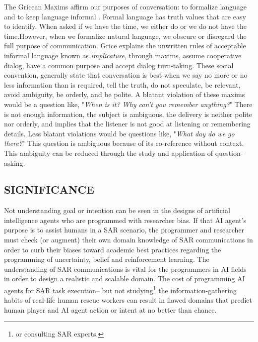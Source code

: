 The Gricean Maxims affirm our purposes of conversation: to formalize language and to keep language informal \citet{grice_1975}. Formal language has truth values that are easy to identify. When asked if we have the time, we either do or we do not have the time.However, when we formalize natural language, we obscure or disregard the full purpose of communication. Grice explains the unwritten rules of acceptable informal language known as \emph{implicature}, through maxims,  assume cooperative dialog, have a common purpose and accept dialog turn-taking\citet{grice_1975}. These social convention, generally state that conversation is best when we say no more or no less information than is required, tell the truth, do not speculate, be relevant, avoid ambiguity, be orderly, and be polite. A blatant violation of these maxims would be a question like, "\emph{When is it? Why can't you remember anything?}" There is not enough information, the subject is ambiguous, the delivery is neither polite nor orderly, and implies that the listener is not good at listening or remembering details. Less blatant violations would be questions like, "\emph{What day do we go there?}" This question is ambiguous because of its co-reference without context. This ambiguity can be reduced through the study and application of question-asking. 





\subsection{SIGNIFICANCE}

Not understanding goal or intention can be seen in the designs of artificial intelligence agents who are programmed with researcher bias. If that AI agent's purpose is to assist humans in a SAR scenario, the programmer and researcher must check (or augment) their own domain knowledge of SAR communications in order to curb their biases toward academic best practices regarding the programming of uncertainty, belief and reinforcement learning. The understanding of SAR communications is vital for the programmers in AI fields in order to design a realistic and scalable domain. The cost of programming AI agents for SAR task execution-- but not studying\footnote{or consulting SAR experts.} the information-gathering habits of real-life human rescue workers can result in flawed domains that predict human player and AI agent action or intent at no better than chance. 


